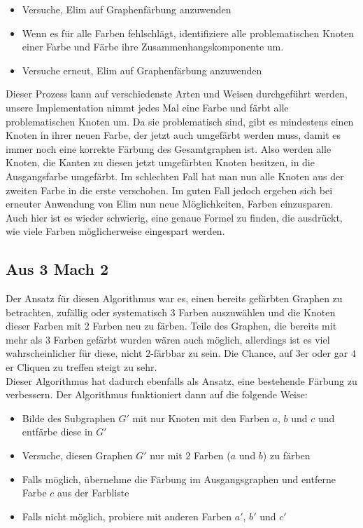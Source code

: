 \documentclass[11pt]{article}
\begin{document}
\begin{itemize}
  \item Versuche, Elim auf Graphenfärbung anzuwenden
  \item Wenn es für alle Farben fehlschlägt, identifiziere alle problematischen Knoten einer Farbe und Färbe ihre Zusammenhangskomponente um.
  \item Versuche erneut, Elim auf Graphenfärbung anzuwenden
\end{itemize}

Dieser Prozess kann auf verschiedenste Arten und Weisen durchgeführt werden, unsere Implementation nimmt jedes Mal eine Farbe und färbt alle problematischen Knoten um.
Da sie problematisch sind, gibt es mindestens einen Knoten in ihrer neuen Farbe, der jetzt auch umgefärbt werden muss, damit es immer noch eine korrekte Färbung des Gesamtgraphen ist.
Also werden alle Knoten, die Kanten zu diesen jetzt umgefärbten Knoten besitzen, in die Ausgangsfarbe umgefärbt. Im schlechten Fall hat man nun alle Knoten aus der zweiten Farbe in die erste verschoben.
Im guten Fall jedoch ergeben sich bei erneuter Anwendung von Elim nun neue Möglichkeiten, Farben einzusparen. \\
Auch hier ist es wieder schwierig, eine genaue Formel zu finden, die ausdrückt, wie viele Farben möglicherweise eingespart werden.


\subsection{Aus 3 Mach 2}

Der Ansatz für diesen Algorithmus war es, einen bereits gefärbten Graphen zu betrachten, zufällig oder systematisch 3 Farben auszuwählen und die Knoten dieser Farben mit 2 Farben neu zu färben.
Teile des Graphen, die bereits mit mehr als $3$ Farben gefärbt wurden wären auch möglich, allerdings ist es viel wahrscheinlicher für diese, nicht $2$-färbbar zu sein.
Die Chance, auf $3$er oder gar $4$er Cliquen zu treffen steigt zu sehr. \\
Dieser Algorithmus hat dadurch ebenfalls als Ansatz, eine bestehende Färbung zu verbessern. Der Algorithmus funktioniert dann auf die folgende Weise: \\

\begin{itemize}
  \item Bilde des Subgraphen $G'$ mit nur Knoten mit den Farben $a$, $b$ und $c$ und entfärbe diese in $G'$
  \item Versuche, diesen Graphen $G'$ nur mit $2$ Farben ($a$ und $b$) zu färben
  \item Falls möglich, übernehme die Färbung im Ausgangsgraphen und entferne Farbe $c$ aus der Farbliste
  \item Falls nicht möglich, probiere mit anderen Farben $a'$, $b'$ und $c'$
\end{itemize}
\end{document}
